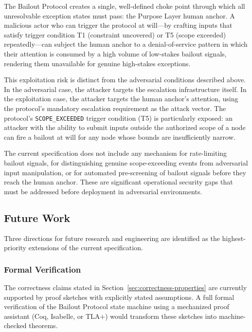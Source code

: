 The Bailout Protocol creates a single, well-defined choke point through which all unresolvable exception states must pass: the Purpose Layer human anchor. A malicious actor who can trigger the protocol at will---by crafting inputs that satisfy trigger condition T1 (constraint uncovered) or T5 (scope exceeded) repeatedly---can subject the human anchor to a denial-of-service pattern in which their attention is consumed by a high volume of low-stakes bailout signals, rendering them unavailable for genuine high-stakes exceptions.

This exploitation risk is distinct from the adversarial conditions described above. In the adversarial case, the attacker targets the escalation infrastructure itself. In the exploitation case, the attacker targets the human anchor's attention, using the protocol's mandatory escalation requirement as the attack vector. The protocol's \texttt{SCOPE\_EXCEEDED} trigger condition (T5) is particularly exposed: an attacker with the ability to submit inputs outside the authorized scope of a node can fire a bailout at will for any node whose bounds are insufficiently narrow.

The current specification does not include any mechanism for rate-limiting bailout signals, for distinguishing genuine scope-exceeding events from adversarial input manipulation, or for automated pre-screening of bailout signals before they reach the human anchor. These are significant operational security gaps that must be addressed before deployment in adversarial environments.

\subsection{Future Work}\label{sec:future-work}

Three directions for future research and engineering are identified as the highest-priority extensions of the current specification.

\subsubsection{Formal Verification}\label{sec:formal-verification}

The correctness claims stated in Section~\ref{sec:correctness-properties} are currently supported by proof sketches with explicitly stated assumptions. A full formal verification of the Bailout Protocol state machine using a mechanized proof assistant (Coq, Isabelle, or TLA$+$) would transform these sketches into machine-checked theorems.

